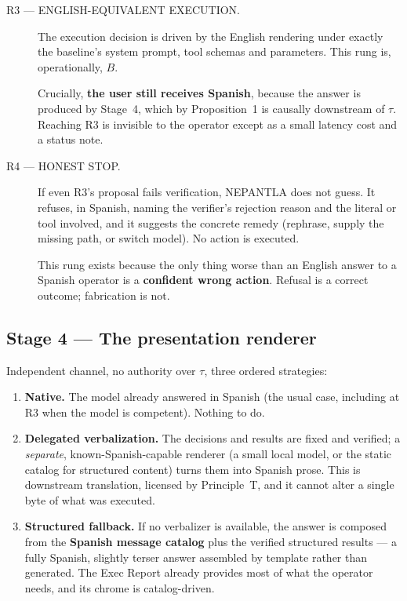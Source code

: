 \begin{description}
\item[R3 --- ENGLISH-EQUIVALENT EXECUTION.] The execution decision is driven by
the English rendering under exactly the baseline's system prompt, tool schemas
and parameters. This rung is, operationally, $B$.

Crucially, \textbf{the user still receives Spanish}, because the answer is
produced by Stage~4, which by Proposition~1 is causally downstream of $\tau$.
Reaching R3 is invisible to the operator except as a small latency cost and a
status note.

\item[R4 --- HONEST STOP.] If even R3's proposal fails verification, NEPANTLA
does not guess. It refuses, in Spanish, naming the verifier's rejection reason
and the literal or tool involved, and it suggests the concrete remedy (rephrase,
supply the missing path, or switch model). No action is executed.

This rung exists because the only thing worse than an English answer to a
Spanish operator is a \textbf{confident wrong action}. Refusal is a correct
outcome; fabrication is not.

\end{description}

\subsection{Stage 4 --- The presentation renderer}
\label{sec:presentation-renderer}

Independent channel, no authority over $\tau$, three ordered strategies:

\begin{enumerate}
  \item \textbf{Native.} The model already answered in Spanish (the usual case,
        including at R3 when the model is competent). Nothing to do.
  \item \textbf{Delegated verbalization.} The decisions and results are fixed
        and verified; a \emph{separate}, known-Spanish-capable renderer (a small
        local model, or the static catalog for structured content) turns them
        into Spanish prose. This is downstream translation, licensed by
        Principle~T, and it cannot alter a single byte of what was executed.
  \item \textbf{Structured fallback.} If no verbalizer is available, the answer
        is composed from the \textbf{Spanish message catalog} plus the verified
        structured results --- a fully Spanish, slightly terser answer assembled
        by template rather than generated. The Exec Report already provides most
        of what the operator needs, and its chrome is catalog-driven.
\end{enumerate}


